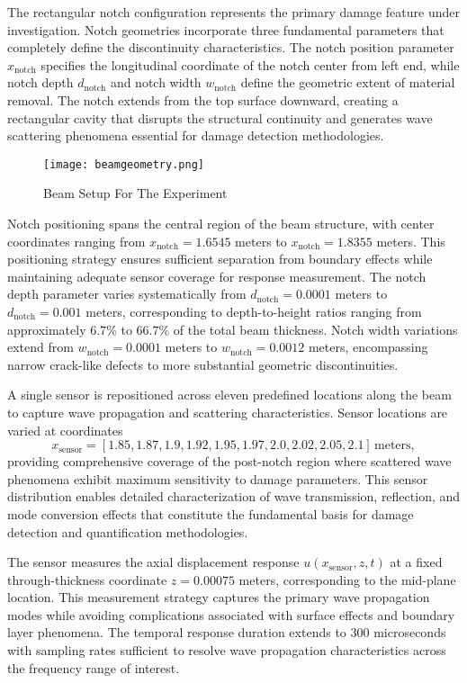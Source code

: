 \documentclass[12pt,a4paper]{report}
\begin{document}
The rectangular notch configuration represents the primary damage feature under investigation. Notch geometries incorporate three fundamental parameters that completely define the discontinuity characteristics. The notch position parameter $x_{\text{notch}}$ specifies the longitudinal coordinate of the notch center from left end, while notch depth $d_{\text{notch}}$ and notch width $w_{\text{notch}}$ define the geometric extent of material removal. The notch extends from the top surface downward, creating a rectangular cavity that disrupts the structural continuity and generates wave scattering phenomena essential for damage detection methodologies.

\begin{figure}[htbp]
\centering
\texttt{[image: beamgeometry.png]}
\caption{Beam Setup For The Experiment}
\label{fig:autoencoder_architecture}
\end{figure}

Notch positioning spans the central region of the beam structure, with center coordinates ranging from $x_{\text{notch}} = 1.6545$ meters to $x_{\text{notch}} = 1.8355$ meters. This positioning strategy ensures sufficient separation from boundary effects while maintaining adequate sensor coverage for response measurement. The notch depth parameter varies systematically from $d_{\text{notch}} = 0.0001$ meters to $d_{\text{notch}} = 0.001$ meters, corresponding to depth-to-height ratios ranging from approximately $6.7\%$ to $66.7\%$ of the total beam thickness. Notch width variations extend from $w_{\text{notch}} = 0.0001$ meters to $w_{\text{notch}} = 0.0012$ meters, encompassing narrow crack-like defects to more substantial geometric discontinuities.

A single sensor is repositioned across eleven predefined locations along the beam to capture wave propagation and scattering characteristics. Sensor locations are varied at coordinates
\[
x_{\text{sensor}} = [1.85, 1.87, 1.9, 1.92, 1.95, 1.97, 2.0, 2.02, 2.05, 2.1] \, \text{meters},
\]
providing comprehensive coverage of the post-notch region where scattered wave phenomena exhibit maximum sensitivity to damage parameters. This sensor distribution enables detailed characterization of wave transmission, reflection, and mode conversion effects that constitute the fundamental basis for damage detection and quantification methodologies.

The sensor measures the axial displacement response $u(x_{\text{sensor}}, z, t)$ at a fixed through-thickness coordinate $z = 0.00075$ meters, corresponding to the mid-plane location. This measurement strategy captures the primary wave propagation modes while avoiding complications associated with surface effects and boundary layer phenomena. The temporal response duration extends to $300$ microseconds with sampling rates sufficient to resolve wave propagation characteristics across the frequency range of interest.
\end{document}
